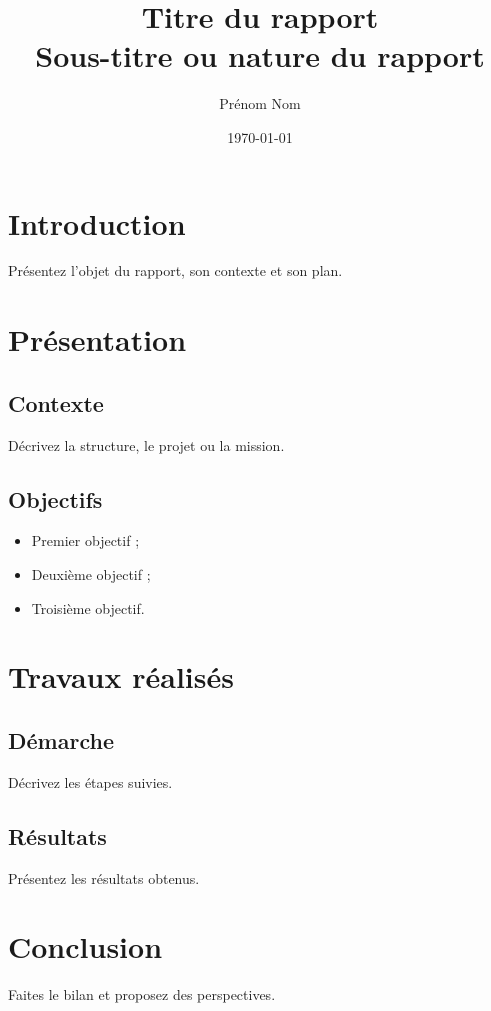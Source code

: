 \documentclass[11pt,a4paper]{report}
\title{Titre du rapport\\[0.5em] \large Sous-titre ou nature du rapport}
\author{Prénom Nom}
\date{\today}
\begin{document}
\maketitle
\tableofcontents

\chapter{Introduction}
Présentez l'objet du rapport, son contexte et son plan.

\chapter{Présentation}
\section{Contexte}
Décrivez la structure, le projet ou la mission.

\section{Objectifs}
\begin{itemize}
  \item Premier objectif ;
  \item Deuxième objectif ;
  \item Troisième objectif.
\end{itemize}

\chapter{Travaux réalisés}
\section{Démarche}
Décrivez les étapes suivies.

\section{Résultats}
Présentez les résultats obtenus.

\chapter{Conclusion}
Faites le bilan et proposez des perspectives.
\end{document}

